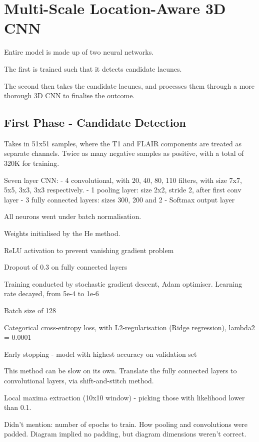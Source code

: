 \documentclass[honours,12pt]{unswthesis}
\numberwithin{equation}{section}
\begin{document}
\section{Multi-Scale Location-Aware 3D CNN}\label{litrev-paper1}

Entire model is made up of two neural networks.

The first is trained such that it detects candidate lacunes.

The second then takes the candidate lacunes, and processes them through a more thorough 3D CNN to finalise the outcome.

\subsection{First Phase - Candidate Detection}

Takes in 51x51 samples, where the T1 and FLAIR components are treated as separate channels. Twice as many negative samples as positive, with a total of 320K for training.

Seven layer CNN:
- 4 convolutional, with 20, 40, 80, 110 filters, with size 7x7, 5x5, 3x3, 3x3 respectively.
- 1 pooling layer: size 2x2, stride 2, after first conv layer
- 3 fully connected layers: sizes 300, 200 and 2
- Softmax output layer

All neurons went under batch normalisation.

Weights initialised by the He method.

ReLU activation to prevent vanishing gradient problem

Dropout of 0.3 on fully connected layers

Training conducted by stochastic gradient descent, Adam optimiser. Learning rate decayed, from 5e-4 to 1e-6

Batch size of 128

Categorical cross-entropy loss, with L2-regularisation (Ridge regression), lambda2 = 0.0001

Early stopping - model with highest accuracy on validation set


This method can be slow on its own. Translate the fully connected layers to convolutional layers, via shift-and-stitch method.

Local maxima extraction (10x10 window) - picking those with likelihood lower than 0.1.


Didn't mention: number of epochs to train. How pooling and convolutions were padded. Diagram implied no padding, but diagram dimensions weren't correct. 
\end{document}
